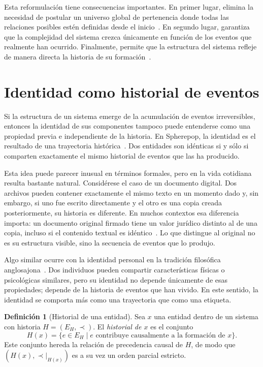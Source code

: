 \documentclass[12pt]{article}
\theoremstyle{plain}
\theoremstyle{definition}
\newtheorem{definition}[theorem]{Definición}
\begin{document}
Esta reformulación tiene consecuencias importantes. En primer lugar, elimina la necesidad de postular un universo global de pertenencia donde todas las relaciones posibles estén definidas desde el inicio~\cite{zermelo}. En segundo lugar, garantiza que la complejidad del sistema crezca únicamente en función de los eventos que realmente han ocurrido. Finalmente, permite que la estructura del sistema refleje de manera directa la historia de su formación~\cite{simons,fowler}.

\section{Identidad como historial de eventos}
\label{sec:identidad}

Si la estructura de un sistema emerge de la acumulación de eventos irreversibles, entonces la identidad de sus componentes tampoco puede entenderse como una propiedad previa e independiente de la historia. En Spherepop, la identidad es el resultado de una trayectoria histórica~\cite{kim,fine,wiggins}. Dos entidades son idénticas si y sólo si comparten exactamente el mismo historial de eventos que las ha producido.

Esta idea puede parecer inusual en términos formales, pero en la vida cotidiana resulta bastante natural. Considérese el caso de un documento digital. Dos archivos pueden contener exactamente el mismo texto en un momento dado y, sin embargo, si uno fue escrito directamente y el otro es una copia creada posteriormente, su historia es diferente. En muchos contextos esa diferencia importa: un documento original firmado tiene un valor jurídico distinto al de una copia, incluso si el contenido textual es idéntico~\cite{austin}. Lo que distingue al original no es su estructura visible, sino la secuencia de eventos que lo produjo.

Algo similar ocurre con la identidad personal en la tradición filosófica anglosajona~\cite{parfit,locke}. Dos individuos pueden compartir características físicas o psicológicas similares, pero su identidad no depende únicamente de esas propiedades; depende de la historia de eventos que han vivido. En este sentido, la identidad se comporta más como una trayectoria que como una etiqueta.

\begin{definition}[Historial de una entidad]
\label{def:historial}
Sea $x$ una entidad dentro de un sistema con historia $H = (E_H, \prec)$. El \emph{historial de $x$} es el conjunto
\[
H(x) = \bigl\{ e \in E_H \mid e \text{ contribuye causalmente a la formación de } x \bigr\}.
\]
Este conjunto hereda la relación de precedencia causal de $H$, de modo que $(H(x), \prec|_{H(x)})$ es a su vez un orden parcial estricto.
\end{definition}
\end{document}
